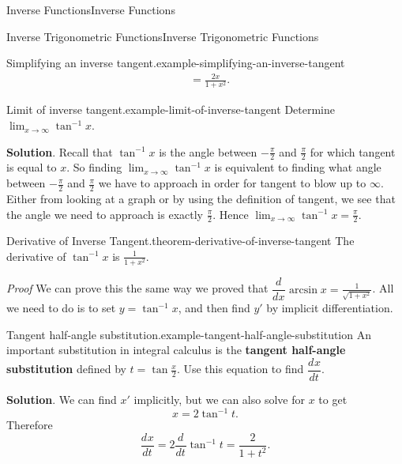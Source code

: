 \documentclass[10pt,]{book}
\makeatletter
\newcommand{\terminology}[1]{\textbf{#1}}
\renewcommand*{\proofname}{Proof}
\renewenvironment{proof}[1][\proofname]{\par
  \pushQED{\qed}%
  \normalfont \topsep6\p@\@plus6\p@\relax
  \trivlist
  \item\relax
    {\itshape
    #1\@addpunct{.}}\hspace\labelsep\ignorespaces
}{%
  \popQED\endtrivlist\@endpefalse
}
\numberwithin{equation}{section}
\newcommand{\dv}[3][]{\dfrac{d^{#1} #2}{d #3^{#1}}}
\makeatother
\begin{document}
\begin{chapterptx}{Inverse Functions}{}{Inverse Functions}{}{}
\begin{sectionptx}{Inverse Trigonometric Functions}{}{Inverse Trigonometric Functions}{}{}
\begin{example}{Simplifying an inverse tangent.}{example-simplifying-an-inverse-tangent}
\begin{align*}
& = \frac{2x}{1+x^{2}}. 
\end{align*}
%
\end{example}
\begin{example}{Limit of inverse tangent.}{example-limit-of-inverse-tangent}%
\hypertarget{p-276}{}%
Determine \(\lim_{x\to\infty}\tan^{-1}x\).%
\par\smallskip%
\noindent\textbf{Solution}.\hypertarget{solution-60}{}\quad%
\hypertarget{p-277}{}%
Recall that \(\tan^{-1}x\) is the angle between \(-\frac{\pi}{2}\) and \(\frac{\pi}{2}\) for which tangent is equal to \(x\). So finding \(\lim_{x\to\infty}\tan^{-1}x\) is equivalent to finding what angle between \(-\frac{\pi}{2}\) and \(\frac{\pi}{2}\) we have to approach in order for tangent to blow up to \(\infty\). Either from looking at a graph or by using the definition of tangent, we see that the angle we need to approach is exactly \(\frac{\pi}{2}\). Hence \(\lim_{x\to\infty}\tan^{-1}x = \frac{\pi}{2}\).%
\end{example}
\begin{theorem}{Derivative of Inverse Tangent.}{}{theorem-derivative-of-inverse-tangent}%
\hypertarget{p-278}{}%
The derivative of \(\tan^{-1}x\) is \(\frac{1}{1+x^{2}}\).%
\end{theorem}
\begin{proof}\hypertarget{proof-7}{}
\hypertarget{p-279}{}%
We can prove this the same way we proved that \(\dv{}{x}\arcsin x = \frac{1}{\sqrt{1+x^{2}}}\). All we need to do is to set \(y = \tan^{-1}x\), and then find \(y'\) by implicit differentiation.%
\end{proof}
\begin{example}{Tangent half-angle substitution.}{example-tangent-half-angle-substitution}%
\hypertarget{p-280}{}%
An important substitution in integral calculus is the \terminology{tangent half-angle substitution} defined by \(t = \tan\frac{x}{2}\). Use this equation to find \(\dv{x}{t}\).%
\par\smallskip%
\noindent\textbf{Solution}.\hypertarget{solution-61}{}\quad%
\hypertarget{p-281}{}%
We can find \(x'\) implicitly, but we can also solve for \(x\) to get%
\begin{equation*}
x = 2\tan^{-1}t.
\end{equation*}
Therefore%
\begin{equation*}
\dv{x}{t} = 2\dv{}{t}\tan^{-1}t = \frac{2}{1+t^{2}}.
\end{equation*}
%
\end{example}
\end{sectionptx}

\end{chapterptx}
\end{document}
